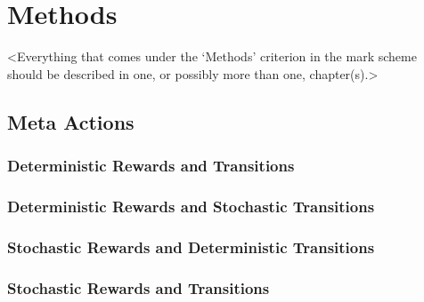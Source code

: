 \chapter{Methods}
\label{chapter2}

<Everything that comes under the `Methods' criterion in the mark scheme should be described in one, or possibly more than one, chapter(s).>

\section{Meta Actions}

\subsection{Deterministic Rewards and Transitions}

\subsection{Deterministic Rewards and Stochastic Transitions}

\subsection{Stochastic Rewards and Deterministic Transitions}

\subsection{Stochastic Rewards and Transitions}